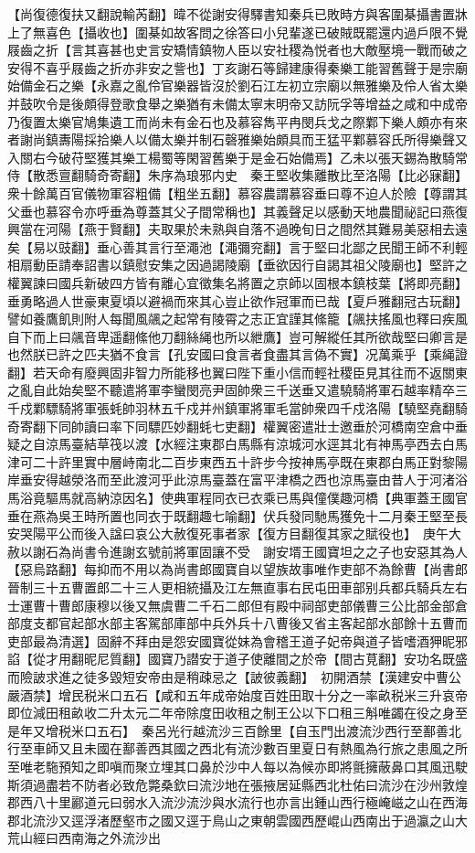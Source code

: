 【尚復德復扶又翻說輸芮翻】暐不從謝安得驛書知秦兵已敗時方與客圍棊攝書置牀上了無喜色【攝收也】圍棊如故客問之徐答曰小兒輩遂已破賊既罷還内過戶限不覺屐齒之折【言其喜甚也史言安矯情鎮物人臣以安社稷為悦者也大敵壓境一戰而破之安得不喜乎屐齒之折亦非安之訾也】丁亥謝石等歸建康得秦樂工能習舊聲于是宗廟始備金石之樂【永嘉之亂伶官樂器皆沒於劉石江左初立宗廟以無雅樂及伶人省太樂并鼓吹令是後頗得登歌食舉之樂猶有未備太寧末明帝又訪阮孚等增益之咸和中成帝乃復置太樂官鳩集遺工而尚未有金石也及慕容雋平冉閔兵戈之際鄴下樂人頗亦有來者謝尚鎮夀陽採拾樂人以備太樂并制石磬雅樂始頗具而王猛平鄴慕容氏所得樂聲又入關右今破苻堅獲其樂工楊蜀等閑習舊樂于是金石始備焉】乙未以張天錫為散騎常侍【散悉亶翻騎奇寄翻】朱序為琅邪内史　秦王堅收集離散比至洛陽【比必寐翻】衆十餘萬百官儀物軍容粗備【粗坐五翻】慕容農謂慕容垂曰尊不迫人於險【尊謂其父垂也慕容令亦呼垂為尊蓋其父子間常稱也】其義聲足以感動天地農聞祕記曰燕復興當在河陽【燕于賢翻】夫取果於未熟與自落不過晚旬日之間然其難易美惡相去遠矣【易以豉翻】垂心善其言行至澠池【澠彌兖翻】言于堅曰北鄙之民聞王師不利輕相扇動臣請奉詔書以鎮慰安集之因過謁陵廟【垂欲因行自謁其祖父陵廟也】堅許之權翼諫曰國兵新破四方皆有離心宜徵集名將置之京師以固根本鎮枝葉【將即亮翻】垂勇略過人世豪東夏頃以避禍而來其心豈止欲作冠軍而已哉【夏戶雅翻冠古玩翻】譬如養鷹飢則附人每聞風飊之起常有陵霄之志正宜謹其絛籠【飊扶搖風也釋曰疾風自下而上曰飊音卑遥翻絛他刀翻絲䋲也所以紲鷹】豈可解縱任其所欲哉堅曰卿言是也然朕已許之匹夫猶不食言【孔安國曰食言者食盡其言偽不實】况萬乘乎【乘䋲證翻】若天命有廢興固非智力所能移也翼曰陛下重小信而輕社稷臣見其往而不返關東之亂自此始矣堅不聽遣將軍李蠻閔亮尹固帥衆三千送垂又遣驍騎將軍石越率精卒三千戍鄴驃騎將軍張蚝帥羽林五千戍并州鎮軍將軍毛當帥衆四千戍洛陽【驍堅堯翻騎奇寄翻下同帥讀曰率下同驃匹妙翻蚝七吏翻】權翼密遣壯士邀垂於河橋南空倉中垂疑之自涼馬臺結草筏以渡【水經注東郡白馬縣有涼城河水逕其北有神馬亭西去白馬津可二十許里實中層峙南北二百步東西五十許步今按神馬亭既在東郡白馬正對黎陽岸垂安得越滎洛而至此渡河乎此涼馬臺蓋在富平津橋之西也涼馬臺由昔人于河渚浴馬浴竟驅馬就高納涼因名】使典軍程同衣已衣乘已馬與僮僕趣河橋【典軍蓋王國官垂在燕為吳王時所置也同衣于既翻趣七喻翻】伏兵發同馳馬獲免十二月秦王堅至長安哭陽平公而後入諡曰哀公大赦復死事者家【復方目翻復其家之賦役也】　庚午大赦以謝石為尚書令進謝玄號前將軍固讓不受　謝安壻王國寶坦之之子也安惡其為人【惡烏路翻】每抑而不用以為尚書郎國寶自以望族故事唯作吏部不為餘曹【尚書郎晉制三十五曹置郎二十三人更相統攝及江左無直事右民屯田車部别兵都兵騎兵左右士運曹十曹郎康穆以後又無虞曹二千石二郎但有殿中祠部吏部儀曹三公比部金部倉部度支都官起部水部主客駕部庫部中兵外兵十八曹後又省主客起部水部餘十五曹而吏部最為清選】固辭不拜由是怨安國寶從妹為會稽王道子妃帝與道子皆嗜酒狎昵邪諂【從才用翻昵尼質翻】國寶乃譛安于道子使離間之於帝【間古莧翻】安功名既盛而險詖求進之徒多毀短安帝由是稍疎忌之【詖彼義翻】　初開酒禁【漢建安中曹公嚴酒禁】增民税米口五石【咸和五年成帝始度百姓田取十分之一率畝税米三升哀帝即位減田租畝收二升太元二年帝除度田收租之制王公以下口租三斛唯蠲在役之身至是年又增税米口五石】　秦呂光行越流沙三百餘里【自玉門出渡流沙西行至鄯善北行至車師又且未國在鄯善西其國之西北有流沙數百里夏日有熱風為行旅之患風之所至唯老駞預知之即嗔而聚立埋其口鼻於沙中人每以為候亦即將氈擁蔽鼻口其風迅駛斯須過盡若不防者必致危斃桑欽曰流沙地在張掖居延縣西北杜佑曰流沙在沙州敦煌郡西八十里酈道元曰弱水入流沙流沙與水流行也亦言出鍾山西行極崦嵫之山在西海郡北流沙又逕浮渚歷壑市之國又逕于鳥山之東朝雲國西歷崐山西南出于過瀛之山大荒山經曰西南海之外流沙出